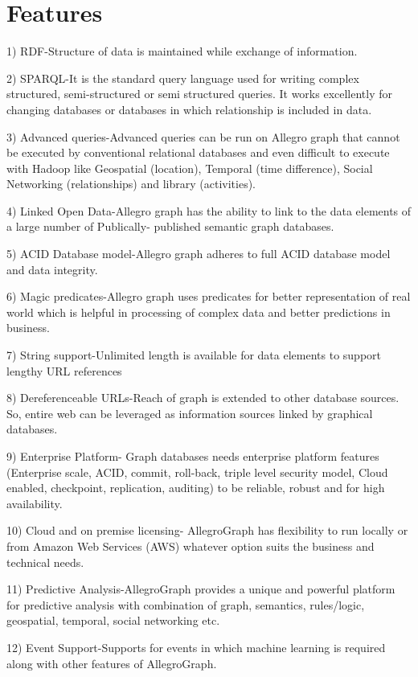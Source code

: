 \documentclass[9pt,twocolumn,twoside]{../../styles/osajnl}
\begin{document}
\section{Features}
1) RDF-Structure of data is maintained while exchange of information.

2) SPARQL-It is the standard query language used for writing complex structured, semi-structured or semi structured queries. It works excellently for changing databases or databases in which relationship is included in data.

3) Advanced queries-Advanced queries can be run on Allegro graph that cannot be executed by conventional relational databases and even difficult to execute with Hadoop like Geospatial (location), Temporal (time difference), Social Networking (relationships) and library (activities).

4) Linked Open Data-Allegro graph has the ability to link to the data elements of a large number of
Publically- published semantic graph databases.

5) ACID Database model-Allegro graph adheres to full ACID database model and data integrity.

6) Magic predicates-Allegro graph uses predicates for better representation of real world which is helpful in processing of complex data and better predictions in business.

7) String support-Unlimited length is available for data elements to support lengthy URL references

8) Dereferenceable URLs-Reach of graph is extended to other database sources. So, entire web can be leveraged as information sources linked by graphical databases.

9)  Enterprise Platform- Graph databases needs enterprise platform features (Enterprise scale, ACID, commit, roll-back, triple level security model, Cloud enabled, checkpoint, replication, auditing) to be reliable, robust and for high availability.

10) Cloud and on premise licensing- AllegroGraph has flexibility to run locally or from Amazon Web Services (AWS) whatever option suits the business and technical needs.

11) Predictive Analysis-AllegroGraph provides a unique and powerful platform for predictive analysis with combination of graph, semantics, rules/logic, geospatial, temporal, social networking etc.

12) Event Support-Supports for events in which machine learning is required along with other features of AllegroGraph.
\end{document}
